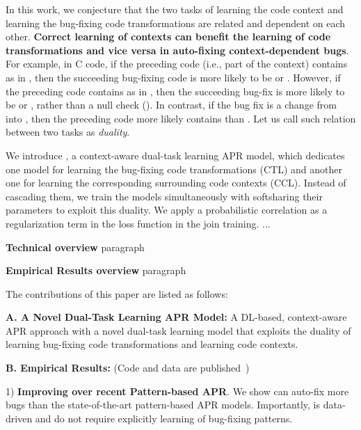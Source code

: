 In this work, we conjecture that the two tasks of learning the code
context and learning the bug-fixing code transformations are related
and dependent on each other. {\bf Correct learning of contexts can
  benefit the learning of code transformations and vice versa in
  auto-fixing context-dependent bugs}. For example, in C code, if the
preceding code (i.e., part of the context) contains  as in
, then the succeeding
bug-fixing code is more likely to be  or
. However, if the preceding code contains
 as in , then the
succeeding bug-fix is more likely to be  or
, rather than a null check (). In contrast, if the bug fix is a
change from  into , then the
preceding code more likely contains  than .
Let us call such relation between two tasks as {\em duality}.

We introduce {\tool}, a context-aware dual-task learning APR model,
which dedicates one model for learning the bug-fixing code
transformations (CTL) and another one for learning the corresponding
surrounding code contexts (CCL). Instead of cascading them, we train
the models simultaneously with softsharing their parameters to exploit
this duality. We apply a probabilistic correlation as a regularization
term in the loss function in the join training. ...

{\bf Technical overview} paragraph

{\bf Empirical Results overview} paragraph

The contributions of this paper are listed as follows:


{\bf A. A Novel Dual-Task Learning APR Model:} A DL-based,
context-aware APR approach with a novel dual-task learning model that
exploits the duality of learning bug-fixing code transformations and
learning code contexts.

{\bf B. Empirical Results:} (Code and data are published~\cite{AutoFix2019})

1) {\bf Improving over recent Pattern-based APR}.  We
show {\tool} can auto-fix more bugs than the state-of-the-art
pattern-based APR models. Importantly, {\tool} is data-driven and do
not require explicitly learning of bug-fixing patterns.

